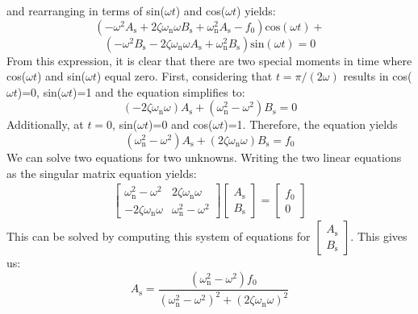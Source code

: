 \documentclass[12pt,letter]{article}
\begin{document}
 and rearranging in terms of sin($\omega t$) and cos($\omega t$) yields: 
 \begin{equation}
  (-\omega^2 A_\text{s} + 2 \zeta \omega_\text{n} \omega B_\text{s} + \omega_\text{n}^2 A_\text{s} -f_0) \text{cos}(\omega t) + 
 \end{equation}
 \begin{equation*}
  (-\omega^2 B_\text{s} - 2 \zeta \omega_\text{n} \omega A_\text{s} + \omega_\text{n}^2 B_\text{s})\text{sin}(\omega t) =0
 \end{equation*} 
 From this expression, it is clear that there are two special moments in time where cos($\omega t$) and sin($\omega t$) equal zero. First, considering that $t=\pi/(2\omega)$ results in cos($\omega t$)=0, sin($\omega t$)=1 and the equation simplifies to:
 \begin{equation}
  (-2\zeta \omega_\text{n} \omega)A_\text{s} + (\omega_\text{n}^2 - \omega^2)B_\text{s} = 0
 \end{equation} 
 Additionally, at $t=0$, sin($\omega t$)=0 and cos($\omega t$)=1. Therefore, the equation yields  
 \begin{equation}
  (\omega_\text{n}^2 - \omega^2)A_\text{s} + (2\zeta \omega_\text{n} \omega)B_\text{s} = f_0
 \end{equation}    
 We can solve two equations for two unknowns. Writing the two linear equations as the singular matrix equation yields:
 \begin{gather}
\begin{bmatrix}
\omega_\text{n}^2 - \omega^2 & 2\zeta \omega_\text{n} \omega \\
- 2\zeta \omega_\text{n} \omega &  \omega_\text{n}^2 - \omega^2
\end{bmatrix}
\begin{bmatrix}
A_\text{s} \\
B_\text{s}
\end{bmatrix}
= \begin{bmatrix} f_0 \\ 0
\end{bmatrix}
 \end{gather}
 This can be solved by computing this system of equations for $\begin{bmatrix}
  A_\text{s} \\
  B_\text{s}
 \end{bmatrix}$. This gives us:
 \begin{equation}
  A_\text{s} = \frac{(\omega_\text{n}^2 - \omega^2)f_0}{(\omega_\text{n}^2 - \omega^2)^2 +  (2\zeta \omega_\text{n} \omega)^2}
 \end{equation} 
\end{document}
